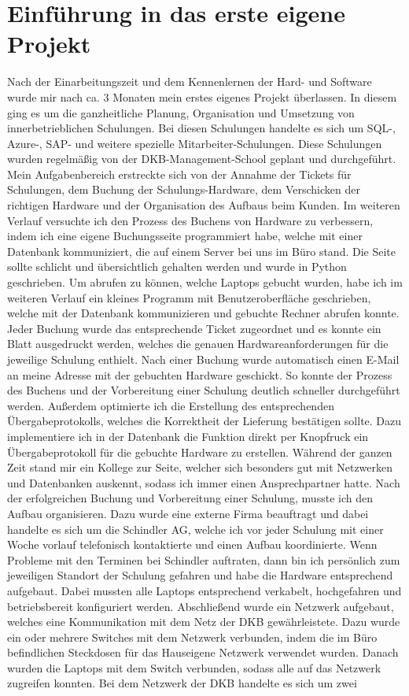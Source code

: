 \section{Einführung in das erste eigene Projekt}
\label{sec:Einführung in das erste eigene Projekt}

Nach der Einarbeitungszeit und dem Kennenlernen der Hard- und Software wurde mir nach ca. 3 Monaten mein erstes eigenes Projekt überlassen. In diesem ging es um die ganzheitliche Planung, Organisation und Umsetzung von innerbetrieblichen Schulungen. Bei diesen Schulungen handelte es sich um SQL-, Azure-, SAP- und weitere spezielle Mitarbeiter-Schulungen. Diese Schulungen wurden regelmäßig von der DKB-Management-School geplant und durchgeführt. Mein Aufgabenbereich erstreckte sich von der Annahme der Tickets für Schulungen, dem Buchung der Schulungs-Hardware, dem Verschicken der richtigen Hardware und der Organisation des Aufbaus beim Kunden. Im weiteren Verlauf versuchte ich den Prozess des Buchens von Hardware zu verbessern, indem ich eine eigene Buchungsseite programmiert habe, welche mit einer Datenbank kommuniziert, die auf einem Server bei uns im Büro stand. Die Seite sollte schlicht und übersichtlich gehalten werden und wurde in Python geschrieben. Um abrufen zu können, welche Laptops gebucht wurden, habe ich im weiteren Verlauf ein kleines Programm mit Benutzeroberfläche geschrieben, welche mit der Datenbank kommunizieren und gebuchte Rechner abrufen konnte. Jeder Buchung wurde das entsprechende Ticket zugeordnet und es konnte ein Blatt ausgedruckt werden, welches die genauen Hardwareanforderungen für die jeweilige Schulung enthielt. Nach einer Buchung wurde automatisch einen E-Mail an meine Adresse mit der gebuchten Hardware geschickt. So konnte der Prozess des Buchens und der Vorbereitung einer Schulung deutlich schneller durchgeführt werden. Außerdem optimierte ich die Erstellung des entsprechenden Übergabeprotokolls, welches die Korrektheit der Lieferung bestätigen sollte. Dazu implementiere ich in der Datenbank die Funktion direkt per Knopfruck ein Übergabeprotokoll für die gebuchte Hardware zu erstellen. Während der ganzen Zeit stand mir ein Kollege zur Seite, welcher sich besonders gut mit Netzwerken und Datenbanken auskennt, sodass ich immer einen Ansprechpartner hatte. Nach der erfolgreichen Buchung und Vorbereitung einer Schulung, musste ich den Aufbau organisieren. Dazu wurde eine externe Firma beauftragt und dabei handelte es sich um die Schindler AG, welche ich vor jeder Schulung mit einer Woche vorlauf telefonisch kontaktierte und einen Aufbau koordinierte. Wenn Probleme mit den Terminen bei Schindler auftraten, dann bin ich persönlich zum jeweiligen Standort der Schulung gefahren und habe die Hardware entsprechend aufgebaut. Dabei mussten alle Laptops entsprechend verkabelt, hochgefahren und betriebsbereit konfiguriert werden. Abschließend wurde ein Netzwerk aufgebaut, welches eine Kommunikation mit dem Netz der DKB gewährleistete. Dazu wurde ein oder mehrere Switches mit dem Netzwerk verbunden, indem die im Büro befindlichen Steckdosen für das Hauseigene Netzwerk verwendet wurden. Danach wurden die Laptops mit dem Switch verbunden, sodass alle auf das Netzwerk zugreifen konnten. Bei dem Netzwerk der DKB handelte es sich um zwei 